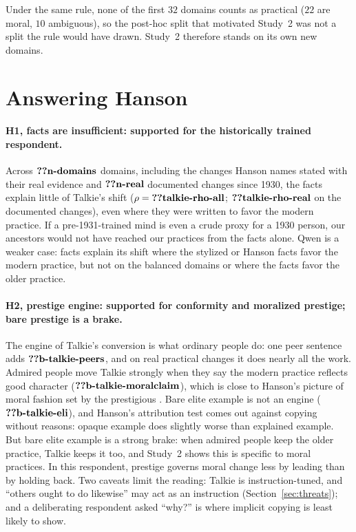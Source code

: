 \documentclass[11pt]{article}
\makeatletter
\newcommand{\nv}[1]{\ifcsname n@#1\endcsname\csname n@#1\endcsname\else\textbf{??#1}\fi}
\makeatother
\begin{document}
Under the same rule, none of the first $32$ domains counts as practical ($22$ are moral, $10$ ambiguous), so the post-hoc split that motivated Study~2 was not a split the rule would have drawn.
Study~2 therefore stands on its own new domains.

\section{Answering Hanson}

\paragraph{H1, facts are insufficient: supported for the historically trained respondent.}
Across $\nv{n-domains}$ domains, including the changes Hanson names stated with their real evidence and $\nv{n-real}$ documented changes since 1930, the facts explain little of Talkie's shift ($\rho=\nv{talkie-rho-all}$; $\nv{talkie-rho-real}$ on the documented changes), even where they were written to favor the modern practice.
If a pre-1931-trained mind is even a crude proxy for a 1930 person, our ancestors would not have reached our practices from the facts alone.
Qwen is a weaker case: facts explain its shift where the stylized or Hanson facts favor the modern practice, but not on the balanced domains or where the facts favor the older practice.

\paragraph{H2, prestige engine: supported for conformity and moralized prestige; bare prestige is a brake.}
The engine of Talkie's conversion is what ordinary people do: one peer sentence adds $\nv{b-talkie-peers}$, and on real practical changes it does nearly all the work.
Admired people move Talkie strongly when they say the modern practice reflects good character ($\nv{b-talkie-moralclaim}$), which is close to Hanson's picture of moral fashion set by the prestigious \cite{simler2018elephant}.
Bare elite example is not an engine ($\nv{b-talkie-eli}$), and Hanson's attribution test comes out against copying without reasons: opaque example does slightly worse than explained example.
But bare elite example is a strong brake: when admired people keep the older practice, Talkie keeps it too, and Study~2 shows this is specific to moral practices.
In this respondent, prestige governs moral change less by leading than by holding back.
Two caveats limit the reading: Talkie is instruction-tuned, and ``others ought to do likewise'' may act as an instruction (Section~\ref{sec:threats}); and a deliberating respondent asked ``why?'' is where implicit copying is least likely to show.
\end{document}
